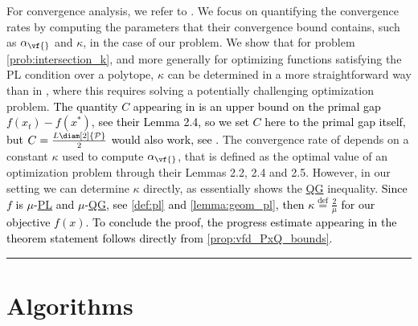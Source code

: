 \documentclass{article}
\newcommand{\jmlrBlackBox}{\rule{1.5ex}{1.5ex}}
\newcommand{\jmlrQED}{\hfill\jmlrBlackBox\par\bigskip}
\providecommand{\proofname}{Proof}
\renewenvironment{proof}%
{%
 \par\noindent{\bfseries\upshape \proofname\ }%
}%
{\jmlrQED}
\newcommand{\mP}{\mathcal{P}}
\newcommand{\defi}{\stackrel{\mathrm{\scriptscriptstyle def}}{=}}
\let\epsilon\varepsilon
\newcommand{\gabrev}[1]{\textcolor{black}{#1}}
\newcommand\newlink[2]{\hyperlink{#1}{\normalcolor #2}}
\newcommand{\PL}{\newlink{def:acronym_polyak_lojasiewicz}{PL}}
\newcommand{\QG}{\newlink{def:acronym_quadratic_growth}{QG}}
\begin{document}
\begin{proof}
For convergence analysis, we refer to {\cite[Theorem 3.1]{BS15}}. We focus on quantifying the convergence rates by computing the parameters that their convergence bound contains, such as $\alpha_{\vf{}}$ and $\kappa$, in the case of our problem.
We show that for problem \eqref{prob:intersection_k}, and more generally for optimizing functions satisfying the PL condition over a polytope, $\kappa$ can be determined in a more straightforward way than in \cite{BS15}, where this requires solving a potentially challenging optimization problem.
\gabrev{The quantity $C$ appearing in {\cite[Theorem 3.1]{BS15}} is an upper bound on the primal gap $f(x_t) - f(x^\ast)$, see their Lemma 2.4, so we set $C$ here to the primal gap itself, but $C = \frac{L\diam[2]{\mP}}{2}$ would also work, see {\cite[Theorem 2.2]{BCC+23}}.}
The convergence rate of {\cite[Theorem 3.1]{BS15}} depends on a constant $\kappa$ used to compute $\alpha_{\vf{}}$, that is defined as the optimal value of an optimization problem through their Lemmas 2.2, 2.4 and 2.5. However, in our setting we can determine $\kappa$ directly, as {\cite[Lemma 2.5]{BS15}} essentially shows the \QG{} inequality. \gabrev{Since $f$ is $\mu$-\PL{} and $\mu$-\QG{}, see \cref{def:pl} and \cref{lemma:geom_pl}, then $\kappa \defi \frac{2}{\mu}$ for our objective $f(x)$.
To conclude the proof, the progress estimate appearing in the theorem statement follows
directly from \cref{prop:vfd_PxQ_bounds}.
}
\end{proof}
%
%
%
%
%
%
%
%
%
%
%
%
%
%
%
%
%
%
%
%
\section{Algorithms}\label{a:algos}
\end{document}
